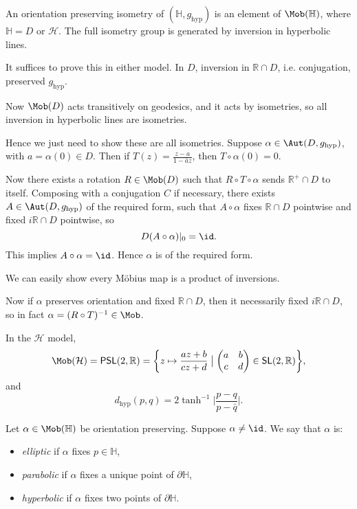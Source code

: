 \documentclass[12pt]{article}
\begin{document}
\begin{lemma}
	An orientation preserving isometry of $(\mathbb{H}, g_\mathrm{hyp})$ is an element of $\Mob(\mathbb{H})$, where $\mathbb{H} = D$ or $\mathcal{H}$. The full isometry group is generated by inversion in hyperbolic lines.
\end{lemma}

\begin{proofbox}
	It suffices to prove this in either model. In $D$, inversion in $\mathbb{R} \cap D$, i.e. conjugation, preserved $g_\mathrm{hyp}$.

	Now $\Mob(D)$ acts transitively on geodesics, and it acts by isometries, so all inversion in hyperbolic lines are isometries.

	Hence we just need to show these are all isometries. Suppose $\alpha \in \Aut(D, g_\mathrm{hyp})$, with $a = \alpha(0) \in D$. Then if $T(z) = \frac{z-a}{1 - \bar a z}$, then $T \circ \alpha (0) = 0$.

	Now there exists a rotation $R \in \Mob(D)$ such that $R \circ T \circ \alpha$ sends $\mathbb{R}^{+} \cap D$ to itself. Composing with a conjugation $C$ if necessary, there exists $A \in \Aut(D, g_\mathrm{hyp})$ of the required form, such that $A \circ \alpha$ fixes $\mathbb{R} \cap D$ pointwise and fixed $i \mathbb{R} \cap D$ pointwise, so
	\[
	D(A \circ \alpha)|_0 = \id.
	\]
	This implies $A \circ \alpha = \id$. Hence $\alpha$ is of the required form.

	We can easily show every M\"{o}bius map is a product of inversions.

	Now if $\alpha$ preserves orientation and fixed $\mathbb{R} \cap D$, then it necessarily fixed $i \mathbb{R} \cap D$, so in fact $\alpha = (R \circ T)^{-1} \in \Mob$.
\end{proofbox}

\begin{remark}
	In the $\mathcal{H}$ model,
	\[
		\Mob(\mathcal{H}) = \mathsf{PSL}(2, \mathbb{R}) = \biggl\{z \mapsto \frac{az + b}{cz + d} \bigm| \begin{pmatrix}a & b\\c & d\end{pmatrix} \in \mathsf{SL}(2, \mathbb{R})\biggr\},
	\]
	and
	\[
		d_\mathrm{hyp} (p, q) = 2 \tanh^{-1} \biggl| \frac{p-q}{p-\bar q}\biggr|.
	\]
\end{remark}

\begin{definition}%
	Let $\alpha \in \Mob(\mathbb{H})$ be orientation preserving. Suppose $\alpha \neq \id$. We say that $\alpha$ is:
	\begin{itemize}
		\item \emph{elliptic} if $\alpha$ fixes $p \in \mathbb{H}$,
		\item \emph{parabolic} if $\alpha$ fixes a unique point of $\partial \mathbb{H}$,
		\item \emph{hyperbolic} if $\alpha$ fixes two points of $\partial \mathbb{H}$.
	\end{itemize}
\end{definition}
\end{document}
